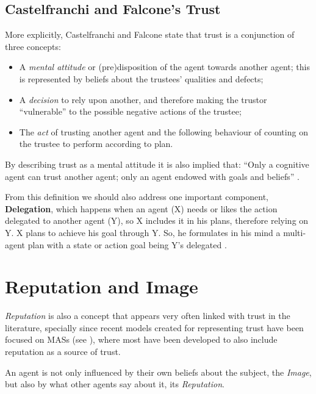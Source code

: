 \subsection{Castelfranchi and Falcone's Trust}
\label{subsec:CastelfranchiTrust}
More explicitly, Castelfranchi and Falcone \cite{Castelfranchi1998} state that trust is a conjunction of three concepts:
\begin{itemize}
    \item A \textit{mental attitude} or (pre)disposition of the agent towards another agent; this is represented by beliefs about the trustees' qualities and defects;
    \item A \textit{decision} to rely upon another, and therefore making the trustor ``vulnerable'' to the possible negative actions of the trustee;
    \item The \textit{act} of trusting another agent and the following behaviour of counting on the trustee to perform according to plan. 
\end{itemize}
By describing trust as a mental attitude it is also implied that: ``Only a cognitive agent can trust another agent; only an agent endowed with goals and beliefs'' \cite{Castelfranchi2010}.

From this definition we should also address one important component, \textbf{Delegation}, which happens when an agent (X) needs or likes the action delegated to another agent (Y), so X includes it in his plans, therefore relying on Y. X plans to achieve his goal through Y. So, he formulates in his mind a multi-agent plan with a state or action goal being Y’s delegated \cite{Castelfranchi1998}.



\section{Reputation and Image}
\label{sec:Reputation}
\textit{Reputation} is also a concept that appears very often linked with trust in the literature, specially since recent models created for representing trust have been focused on \acp{MAS} (see \cite{Abdul-rahman2000, Sabater2002, Sabater2006, Huynh2006, Pinyol2009}), where most have been developed to also include reputation as a source of trust.

An agent is not only influenced by their own beliefs about the subject, the \textit{Image}, but also by what other agents say about it, its \textit{Reputation}.

